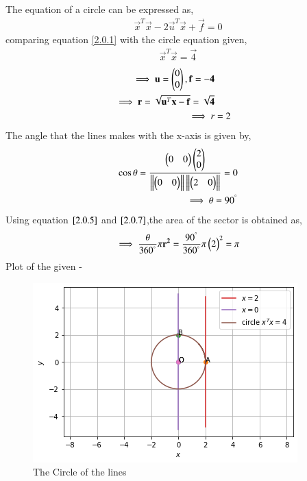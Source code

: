 \documentclass[journal,12pt,twocolumn]{IEEEtran}
\begin{document}
The equation of a circle can be expressed as,
\begin{align}
\vec{x}^T\vec{x} - 2\vec{u}^T\vec{x} + \vec{f}= 0
\label{2.0.1}
\end{align}
comparing equation \eqref{2.0.1} with the circle equation given,
\begin{align}
\vec{x}^T\vec{x} = \vec{4}
\end{align}
\begin{align}
\implies \mathbf{u}=\begin{pmatrix}0\\0\end{pmatrix},\mathbf{f}=\mathbf{-4}
\\
\implies \mathbf{r}=\sqrt{\mathbf{u}^T\mathbf{x}-\mathbf{f}}=\sqrt{\mathbf{4}}
\\
\implies r &=2 \label{2.0.5}
\end{align}
The angle that the lines makes with the x-axis is given by,
\begin{align}
\mathbf{\cos\theta}=\frac{{\begin{pmatrix}0 & 0\end{pmatrix}\begin{pmatrix}2 \\ 0\end{pmatrix} }}{{\left\lVert\begin{pmatrix}0 & 0\end{pmatrix}\right\rVert\left\lVert\begin{pmatrix}2 & 0\end{pmatrix}\right\rVert}}=0
\\
\implies \theta =90^ {\degree} \label{2.0.7}
\end{align}
Using equation $\eqref{2.0.5}$ and $\eqref{2.0.7}$,the area of the sector is obtained as,
\begin{align}
 \implies  \frac{\theta}{360^{\degree}}\pi\mathbf{r^2}=\frac{90^{\degree}}{360^{\degree}}\pi\begin{pmatrix}2\end{pmatrix}^2=\pi
\end{align}
Plot of the given -
\begin{figure}[!ht]
\centering
\includegraphics[width=\columnwidth]{Figure 5.png}
\caption{The Circle of the lines }
\label{fig:The circle of the lines}	\end{figure}
\end{document}
